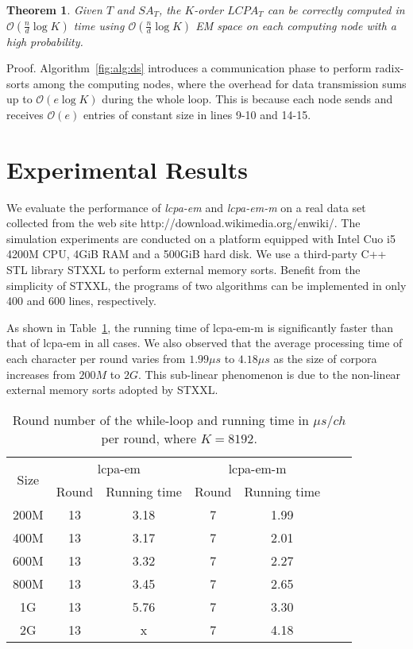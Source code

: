 \documentclass{llncs}
\newtheorem{thm}{Theorem}
\begin{document}
\begin{thm}
\label{thm:lcp:pdm}
Given $T$ and $SA_T$, the $K$-order $LCPA_T$ can be correctly computed in $\mathcal{O}(\frac{n}{d}\log K)$ time using $\mathcal{O}(\frac{n}{d}\log K)$ {EM} space on each computing node with a high probability.
\end{thm}
Proof. Algorithm~\ref{fig:alg:ds} introduces a communication phase to perform radix-sorts among the computing nodes, where the overhead for data transmission sums up to $\mathcal{O}(e\log K)$ during the whole loop. This is because each node sends and receives $\mathcal{O}(e)$ entries of constant size in lines 9-10 and 14-15.



\section{Experimental Results}\label{sec:experimental_results}

We evaluate the performance of {\em lcpa-em} and {\em lcpa-em-m} on a real data set collected from the web site http://download.wikimedia.org/enwiki/. The simulation experiments are conducted on a platform equipped with Intel Cuo i5 4200M CPU, 4GiB RAM and a 500GiB hard disk. We use a third-party {C++} {STL} library {STXXL}\cite{Dementiev2007} to perform external memory sorts. Benefit from the simplicity of {STXXL}, the programs of two algorithms can be implemented in only 400 and 600 lines, respectively.

As shown in Table~\ref{tbl:exp:result}, the running time of {lcpa-em-m} is significantly faster than that of {lcpa-em} in all cases. We also observed that the average processing time of each character per round varies from $1.99\mu s$ to $4.18\mu s$ as the size of corpora increases from $200M$ to $2G$. This sub-linear phenomenon is due to the non-linear external memory sorts adopted by {STXXL}.

\begin{table}
\centering
\label{tbl:exp:result}
\caption{\label{tbl:exp:result} Round number of the while-loop and running time in $\mu s/ch$ per round, where $K=8192$.}
\begin{tabular}{|c|c|c|c|c|c|c|}
\hline
\multirow{2}{*}{Size} &
\multicolumn{2}{c|}{lcpa-em} &
\multicolumn{2}{c|}{lcpa-em-m} \\
\cline{2-5}
 & Round & Running time & Round & Running time\\
\hline
200M & 13 & 3.18 & 7 & 1.99\\
\hline
400M & 13 & 3.17 & 7 & 2.01\\
\hline
600M & 13 & 3.32 & 7 & 2.27\\
\hline
800M & 13 & 3.45 & 7 & 2.65\\
\hline
1G & 13 & 5.76 & 7 & 3.30\\
\hline
2G & 13 & x & 7 & 4.18\\
\hline
\end{tabular}
\end{table}
\end{document}

